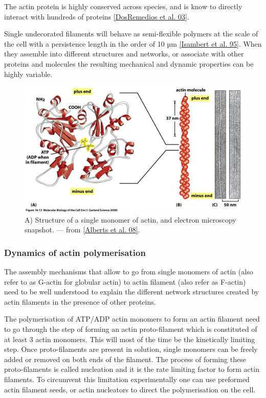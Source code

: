\documentclass[A4paperpaper,11pt,english]{sphinxmanual}
\begin{document}
The actin protein is highly conserved across species, and is know to directly
interact with hundreds of proteins {\hyperref[index-latex:dosremedios2003]{{[}DosRemedios et al. 03{]}}}.

Single undecorated filaments will behave  as
semi-flexible polymers at the scale of the cell with a persistence length in the order of 10 µm {\hyperref[index-latex:isambert1995]{{[}Isambert et al. 95{]}}}. When they
assemble into different structures and networks, or associate with other proteins
and molecules the resulting mechanical and dynamic properties can be highly variable.
\begin{figure}[htbp]
\centering
\capstart

\includegraphics[width=0.700\linewidth]{actin-structure.jpg}
\caption{A) Structure of a single monomer of actin, and electron microscopy snapshot.
— from {\hyperref[index-latex:alberts2008]{{[}Alberts et al. 08{]}}}.}\label{index-latex:fig-actin}\end{figure}


\subsubsection{Dynamics of actin polymerisation}
\label{index-latex:dynamics-of-actin-polymerisation}
The assembly mechanisms that allow to go from single monomers of actin (also
refer to as G-actin for globular actin) to actin filament (also refer as
F-actin) need to be well understood to explain the different network
structures created by actin filaments in the presence of other proteins.

The polymerisation of ATP/ADP actin monomers to form an actin filament need to
go through the step of forming an actin proto-filament which is constituted of
at least 3 actin monomers. This will most of the time be the kinetically
limiting step. Once proto-filaments are present in solution, single monomers
can be freely added or removed on both ends of the filament.  The process of
forming these proto-filaments is called nucleation and it is the rate limiting
factor to form actin filaments. To circumvent this
limitation experimentally one can use preformed actin filament seeds, or actin nucleators
to direct the polymerisation on the cell.
\end{document}
